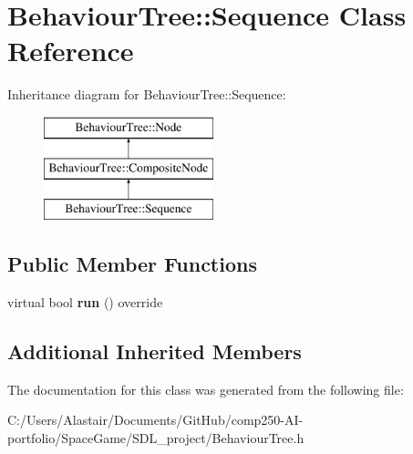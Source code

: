 \hypertarget{class_behaviour_tree_1_1_sequence}{}\section{Behaviour\+Tree\+:\+:Sequence Class Reference}
\label{class_behaviour_tree_1_1_sequence}
Inheritance diagram for Behaviour\+Tree\+:\+:Sequence\+:\begin{figure}[H]
\begin{center}
\leavevmode
\includegraphics[height=3.000000cm]{class_behaviour_tree_1_1_sequence}
\end{center}
\end{figure}
\subsection*{Public Member Functions}
\begin{DoxyCompactItemize}
\item 
\mbox{\label{class_behaviour_tree_1_1_sequence_a041ffcaef411be79a5aaade6e7b1c7b1}} 
virtual bool {\bfseries run} () override
\end{DoxyCompactItemize}
\subsection*{Additional Inherited Members}


The documentation for this class was generated from the following file\+:\begin{DoxyCompactItemize}
\item 
C\+:/\+Users/\+Alastair/\+Documents/\+Git\+Hub/comp250-\/\+A\+I-\/portfolio/\+Space\+Game/\+S\+D\+L\+\_\+project/Behaviour\+Tree.\+h\end{DoxyCompactItemize}
